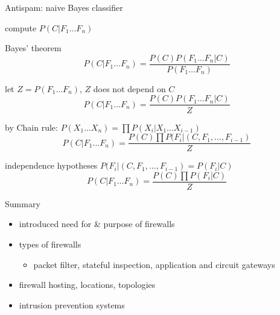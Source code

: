 \documentclass{beamer}
\begin{document}
\begin{frame}{Antispam: naive Bayes classifier}
  \begin{itemize}
     {
  \item compute $P(C|F_1 \dots F_n)$
  \item Bayes' theorem
    \[
    P(C|F_1 \dots F_n) =
    \frac
    {P(C) P(F_1 \dots F_n | C) }
    {P(F_1 \dots F_n)}
    \]
  \item let $Z = P(F_1 \dots F_n)$, $Z$ does not depend on $C$
    \[
    P(C|F_1 \dots F_n) =
    \frac
    {P(C) P(F_1 \dots F_n | C) }
    {Z}
    \]
  }
  \item by Chain rule: $P(X_1 \dots X_n) = \prod{P(X_i | X_1 \dots X_{i-1})}$
    \[
    P(C|F_1 \dots F_n) =
    \frac
    {P(C) 
     \prod{P(F_i| (C,  F_1, \dots, F_{i-1})}
    }
    {Z}
    \]
  \item<2-> independence hypotheses $P(F_i| (C,  F_1, \dots, F_{i-1})
    = P(F_i| C)$
    \[
    P(C|F_1 \dots F_n) =
    \frac
    {P(C) 
     \prod{P(F_i| C)}
    }
    {Z}
    \]
  \end{itemize}
\end{frame}

\begin{frame}{Summary}
  \begin{itemize}
  \item introduced need for \& purpose of firewalls 
  \item types of firewalls 
    \begin{itemize}
    \item packet filter, stateful inspection, application and 
      circuit gateways 
    \end{itemize}
  \item firewall hosting, locations, topologies 
  \item intrusion prevention systems
  \end{itemize}
\end{frame}
\end{document}
